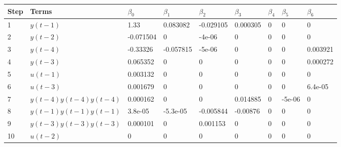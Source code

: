 \begin{tabular}{lllllllll}
Step & Terms & $\beta_{0}$ & $\beta_{1}$ & $\beta_{2}$ & $\beta_{3}$ & $\beta_{4}$ & $\beta_{5}$ & $\beta_{6}$ \\ 
\hline 
1 & $y(t-1)$ & 1.33 & 0.083082 & -0.029105 & 0.000305 & 0 & 0 & 0 \\ 
2 & $y(t-2)$ & -0.071504 & 0 & -4e-06 & 0 & 0 & 0 & 0 \\ 
3 & $y(t-4)$ & -0.33326 & -0.057815 & -5e-06 & 0 & 0 & 0 & 0.003921 \\ 
4 & $y(t-3)$ & 0.065352 & 0 & 0 & 0 & 0 & 0 & 0.000272 \\ 
5 & $u(t-1)$ & 0.003132 & 0 & 0 & 0 & 0 & 0 & 0 \\ 
6 & $u(t-3)$ & 0.001679 & 0 & 0 & 0 & 0 & 0 & 6.4e-05 \\ 
7 & $y(t-4)y(t-4)y(t-4)$ & 0.000162 & 0 & 0 & 0.014885 & 0 & -5e-06 & 0 \\ 
8 & $y(t-1)y(t-1)y(t-1)$ & 3.8e-05 & -5.3e-05 & -0.005844 & -0.00876 & 0 & 0 & 0 \\ 
9 & $y(t-3)y(t-3)y(t-3)$ & 0.000101 & 0 & 0.001153 & 0 & 0 & 0 & 0 \\ 
10 & $u(t-2)$ & 0 & 0 & 0 & 0 & 0 & 0 & 0 \\ 
\hline 
\end{tabular}